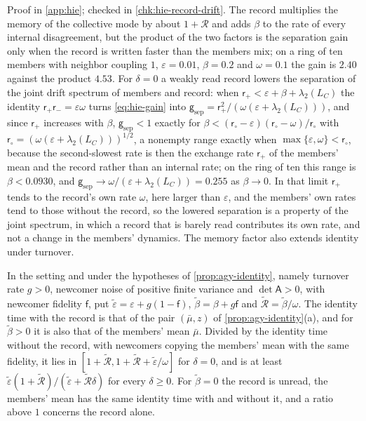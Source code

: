 Proof in \cref{app:hie}; checked in \cref{chk:hie-record-drift}. The record multiplies the memory of the collective mode by about $1+\mathcal R$ and adds $\beta$ to the rate of every internal disagreement, but the product of the two factors is the separation gain only when the record is written faster than the members mix; on a ring of ten members with neighbor coupling $1$, $\varepsilon=0.01$, $\beta=0.2$ and $\omega=0.1$ the gain is $2.40$ against the product $4.53$. For $\delta=0$ a weakly read record lowers the separation of the joint drift spectrum of members and record: when $\mathsf r_+<\varepsilon+\beta+\lambda_2(L_C)$ the identity $\mathsf r_+\mathsf r_-=\varepsilon\omega$ turns \eqref{eq:hie-gain} into $\mathsf g_{\mathrm{sep}}=\mathsf r_+^2/(\omega(\varepsilon+\lambda_2(L_C)))$, and since $\mathsf r_+$ increases with $\beta$, $\mathsf g_{\mathrm{sep}}<1$ exactly for $\beta<(\mathsf r_\circ-\varepsilon)(\mathsf r_\circ-\omega)/\mathsf r_\circ$ with $\mathsf r_\circ=(\omega(\varepsilon+\lambda_2(L_C)))^{1/2}$, a nonempty range exactly when $\max\{\varepsilon,\omega\}<\mathsf r_\circ$, because the second-slowest rate is then the exchange rate $\mathsf r_+$ of the members' mean and the record rather than an internal rate; on the ring of ten this range is $\beta<0.0930$, and $\mathsf g_{\mathrm{sep}}\to\omega/(\varepsilon+\lambda_2(L_C))=0.255$ as $\beta\to0$. In that limit $\mathsf r_+$ tends to the record's own rate $\omega$, here larger than $\varepsilon$, and the members' own rates tend to those without the record, so the lowered separation is a property of the joint spectrum, in which a record that is barely read contributes its own rate, and not a change in the members' dynamics. The memory factor also extends identity under turnover.

\begin{corollary}\label{cor:hie-identity}
In the setting and under the hypotheses of \cref{prop:agy-identity}, namely turnover rate $g>0$, newcomer noise of positive finite variance and $\det\mathsf A>0$, with newcomer fidelity $\mathsf f$, put $\tilde\varepsilon=\varepsilon+g(1-\mathsf f)$, $\tilde\beta=\beta+g\mathsf f$ and $\tilde{\mathcal R}=\tilde\beta/\omega$. The identity time with the record is that of the pair $(\bar\mu,z)$ of \cref{prop:agy-identity}(a), and for $\tilde\beta>0$ it is also that of the members' mean $\bar\mu$. Divided by the identity time without the record, with newcomers copying the members' mean with the same fidelity, it lies in $[1+\tilde{\mathcal R},1+\tilde{\mathcal R}+\tilde\varepsilon/\omega]$ for $\delta=0$, and is at least $\tilde\varepsilon(1+\tilde{\mathcal R})/(\tilde\varepsilon+\tilde{\mathcal R}\delta)$ for every $\delta\ge0$. For $\tilde\beta=0$ the record is unread, the members' mean has the same identity time with and without it, and a ratio above $1$ concerns the record alone.
\end{corollary}

